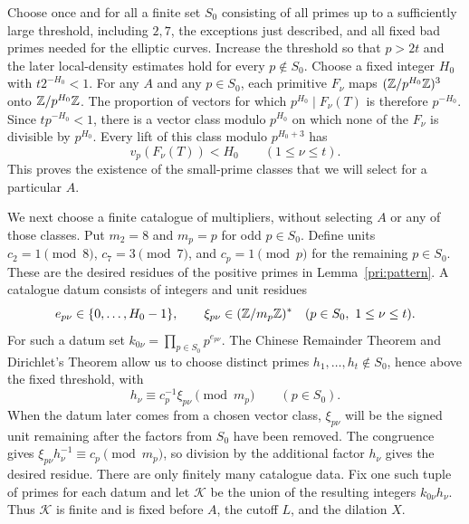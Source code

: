 Choose once and for all a finite set $S_0$ consisting of all primes up
to a sufficiently large threshold, including $2,7$, the exceptions
just described, and all fixed bad primes needed for the elliptic curves.
Increase the threshold so that $p>2t$ and the later local-density
estimates hold for every $p\notin S_0$. Choose a fixed integer $H_0$ with
$t2^{-H_0}<1$. For any $A$ and any $p\in S_0$, each primitive $F_\nu$
maps $(\mathbb Z/p^{H_0}\mathbb Z)^3$ onto $\mathbb Z/p^{H_0}\mathbb Z$. The proportion of vectors for
which $p^{H_0}\mid F_\nu(T)$ is therefore $p^{-H_0}$. Since $tp^{-H_0}<1$,
there is a vector class modulo $p^{H_0}$ on which none of the $F_\nu$ is
divisible by $p^{H_0}$. Every lift of this class modulo $p^{H_0+3}$ has
\[
                   v_p(F_\nu(T))<H_0\qquad(1\le\nu\le t).
\]
This proves the existence of the small-prime classes that we will
select for a particular $A$.

We next choose a finite catalogue of multipliers, without selecting
$A$ or any of those classes. Put $m_2=8$ and $m_p=p$ for odd
$p\in S_0$. Define units $c_2=1\pmod8$, $c_7=3\pmod7$, and
$c_p=1\pmod p$ for the remaining $p\in S_0$. These are the desired
residues of the positive primes in Lemma~\ref{pri:pattern}.
A catalogue datum consists
of integers and unit residues
\[
 e_{p\nu}\in\{0,\ldots,H_0-1\},\qquad
 \xi_{p\nu}\in(\mathbb Z/m_p\mathbb Z)^*
 \quad(p\in S_0,\ 1\le\nu\le t).
\]
For such a datum set $k_{0\nu}=\prod_{p\in S_0}p^{e_{p\nu}}$.
The Chinese Remainder Theorem and Dirichlet's Theorem
\cite[\S4]{Davenport2000} allow us to choose distinct primes
$h_1,\ldots,h_t\notin S_0$, hence above the fixed threshold, with
\begin{equation}\label{pri:multiplier-primes}
                 h_\nu\equiv c_p^{-1}\xi_{p\nu}\pmod{m_p}
                 \qquad(p\in S_0).
\end{equation}
When the datum later comes from a chosen vector class, $\xi_{p\nu}$ will
be the signed unit remaining after the factors from $S_0$ have been
removed. The congruence gives $\xi_{p\nu}h_\nu^{-1}\equiv c_p\pmod{m_p}$,
so division by the additional factor $h_\nu$ gives the desired residue.
There are only finitely many catalogue data. Fix one such tuple of
primes for each datum and let $\mathcal K$ be the union of the resulting
integers $k_{0\nu}h_\nu$. Thus $\mathcal K$ is finite and is fixed
before $A$, the cutoff $L$, and the dilation $X$.

